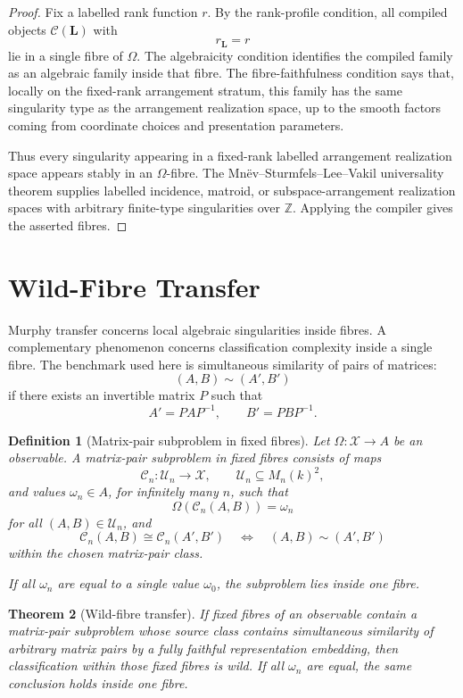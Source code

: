 \documentclass[11pt]{article}
\newtheorem{theorem}{Theorem}[section]
\newtheorem{definition}[theorem]{Definition}
\begin{document}
\begin{proof}
Fix a labelled rank function \(r\). By the rank-profile condition, all compiled objects \(\mathcal C(\mathbf L)\) with
\[
r_{\mathbf L}=r
\]
lie in a single fibre of \(\Omega\). The algebraicity condition identifies the compiled family as an algebraic family inside that fibre. The fibre-faithfulness condition says that, locally on the fixed-rank arrangement stratum, this family has the same singularity type as the arrangement realization space, up to the smooth factors coming from coordinate choices and presentation parameters.

Thus every singularity appearing in a fixed-rank labelled arrangement realization space appears stably in an \(\Omega\)-fibre. The Mnëv--Sturmfels--Lee--Vakil universality theorem supplies labelled incidence, matroid, or subspace-arrangement realization spaces with arbitrary finite-type singularities over \(\mathbb Z\). Applying the compiler gives the asserted fibres.
\end{proof}

\section{Wild-Fibre Transfer}

Murphy transfer concerns local algebraic singularities inside fibres. A complementary phenomenon concerns classification complexity inside a single fibre. The benchmark used here is simultaneous similarity of pairs of matrices:
\[
(A,B)\sim(A',B')
\]
if there exists an invertible matrix \(P\) such that
\[
A'=PAP^{-1},
\qquad
B'=PBP^{-1}.
\]

\begin{definition}[Matrix-pair subproblem in fixed fibres]
Let \(\Omega:\mathcal X\to A\) be an observable. A matrix-pair subproblem in fixed fibres consists of maps
\[
\mathcal C_n:\mathcal U_n\to\mathcal X,
\qquad
\mathcal U_n\subseteq M_n(k)^2,
\]
and values \(\omega_n\in A\), for infinitely many \(n\), such that
\[
\Omega(\mathcal C_n(A,B))=\omega_n
\]
for all \((A,B)\in\mathcal U_n\), and
\[
\mathcal C_n(A,B)\cong \mathcal C_n(A',B')
\quad\Longleftrightarrow\quad
(A,B)\sim(A',B')
\]
within the chosen matrix-pair class.

If all \(\omega_n\) are equal to a single value \(\omega_0\), the subproblem lies inside one fibre.
\end{definition}

\begin{theorem}[Wild-fibre transfer]
If fixed fibres of an observable contain a matrix-pair subproblem whose source class contains simultaneous similarity of arbitrary matrix pairs by a fully faithful representation embedding, then classification within those fixed fibres is wild. If all \(\omega_n\) are equal, the same conclusion holds inside one fibre.
\end{theorem}
\end{document}
